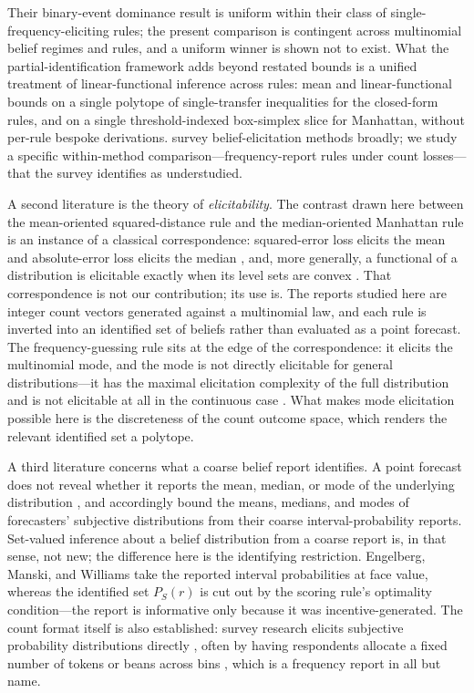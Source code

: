 Their binary-event dominance result is uniform within their class of single-frequency-eliciting rules; the present comparison is contingent across multinomial belief regimes and rules, and a uniform winner is shown not to exist.
What the partial-identification framework adds beyond restated bounds is a unified treatment of linear-functional inference across rules: mean and linear-functional bounds on a single polytope of single-transfer inequalities for the closed-form rules, and on a single threshold-indexed box-simplex slice for Manhattan, without per-rule bespoke derivations.
\citet{SchlagEtAl2013} survey belief-elicitation methods broadly; we study a specific within-method comparison---frequency-report rules under count losses---that the survey identifies as understudied.

A second literature is the theory of \emph{elicitability}.
The contrast drawn here between the mean-oriented squared-distance rule and the median-oriented Manhattan rule is an instance of a classical correspondence: squared-error loss elicits the mean and absolute-error loss elicits the median \citep{Gneiting2011}, and, more generally, a functional of a distribution is elicitable exactly when its level sets are convex \citep{LambertPennockShoham2008}.
That correspondence is not our contribution; its use is.
The reports studied here are integer count vectors generated against a multinomial law, and each rule is inverted into an identified set of beliefs rather than evaluated as a point forecast.
The frequency-guessing rule sits at the edge of the correspondence: it elicits the multinomial mode, and the mode is not directly elicitable for general distributions---it has the maximal elicitation complexity of the full distribution \citep{LambertPennockShoham2008} and is not elicitable at all in the continuous case \citep{Heinrich2014}.
What makes mode elicitation possible here is the discreteness of the count outcome space, which renders the relevant identified set a polytope.

A third literature concerns what a coarse belief report identifies.
A point forecast does not reveal whether it reports the mean, median, or mode of the underlying distribution \citep{Gneiting2011,EngelbergManskiWilliams2009}, and \citet{EngelbergManskiWilliams2009} accordingly bound the means, medians, and modes of forecasters' subjective distributions from their coarse interval-probability reports.
Set-valued inference about a belief distribution from a coarse report is, in that sense, not new; the difference here is the identifying restriction.
Engelberg, Manski, and Williams take the reported interval probabilities at face value, whereas the identified set \(P_S(r)\) is cut out by the scoring rule's optimality condition---the report is informative only because it was incentive-generated.
The count format itself is also established: survey research elicits subjective probability distributions directly \citep{Manski2004}, often by having respondents allocate a fixed number of tokens or beans across bins \citep{DelavandeGineMcKenzie2011}, which is a frequency report in all but name.

